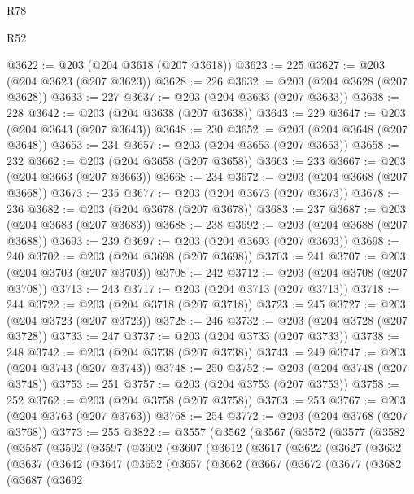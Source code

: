 \begin{lexlean}{R78}
\begin{lexlean}{R52}
\begin{coremodule}
{{{{{{{{{{{{{{{{{{{{{{{{{{{{{{{{{{{{{{{{{{{{{{{{{{{{{{{{{{{{{{{{{{{{{{{{{{{{{{{{{{{{{{{{{{{{{{{{{{{{{{{{{{{{{{{{{{{{{{{{{{{{{{{{{{{{{{{{{{{{{{{{{{{{{{{{{{{{{{{{{{{{{{{{{{{{{{{{{{{{{{{{{{{{{{{{{{{{{{@3622 := @203 (@204 @3618 (@207 @3618))
@3623 := 225
@3627 := @203 (@204 @3623 (@207 @3623))
@3628 := 226
@3632 := @203 (@204 @3628 (@207 @3628))
@3633 := 227
@3637 := @203 (@204 @3633 (@207 @3633))
@3638 := 228
@3642 := @203 (@204 @3638 (@207 @3638))
@3643 := 229
@3647 := @203 (@204 @3643 (@207 @3643))
@3648 := 230
@3652 := @203 (@204 @3648 (@207 @3648))
@3653 := 231
@3657 := @203 (@204 @3653 (@207 @3653))
@3658 := 232
@3662 := @203 (@204 @3658 (@207 @3658))
@3663 := 233
@3667 := @203 (@204 @3663 (@207 @3663))
@3668 := 234
@3672 := @203 (@204 @3668 (@207 @3668))
@3673 := 235
@3677 := @203 (@204 @3673 (@207 @3673))
@3678 := 236
@3682 := @203 (@204 @3678 (@207 @3678))
@3683 := 237
@3687 := @203 (@204 @3683 (@207 @3683))
@3688 := 238
@3692 := @203 (@204 @3688 (@207 @3688))
@3693 := 239
@3697 := @203 (@204 @3693 (@207 @3693))
@3698 := 240
@3702 := @203 (@204 @3698 (@207 @3698))
@3703 := 241
@3707 := @203 (@204 @3703 (@207 @3703))
@3708 := 242
@3712 := @203 (@204 @3708 (@207 @3708))
@3713 := 243
@3717 := @203 (@204 @3713 (@207 @3713))
@3718 := 244
@3722 := @203 (@204 @3718 (@207 @3718))
@3723 := 245
@3727 := @203 (@204 @3723 (@207 @3723))
@3728 := 246
@3732 := @203 (@204 @3728 (@207 @3728))
@3733 := 247
@3737 := @203 (@204 @3733 (@207 @3733))
@3738 := 248
@3742 := @203 (@204 @3738 (@207 @3738))
@3743 := 249
@3747 := @203 (@204 @3743 (@207 @3743))
@3748 := 250
@3752 := @203 (@204 @3748 (@207 @3748))
@3753 := 251
@3757 := @203 (@204 @3753 (@207 @3753))
@3758 := 252
@3762 := @203 (@204 @3758 (@207 @3758))
@3763 := 253
@3767 := @203 (@204 @3763 (@207 @3763))
@3768 := 254
@3772 := @203 (@204 @3768 (@207 @3768))
@3773 := 255
@3822 := @3557
    (@3562
      (@3567
        (@3572
          (@3577
            (@3582
              (@3587
                (@3592
                  (@3597
                    (@3602
                      (@3607
                        (@3612
                          (@3617
                            (@3622
                              (@3627
                                (@3632
                                  (@3637
                                    (@3642
                                      (@3647
                                        (@3652
                                          (@3657
                                            (@3662
                                              (@3667
                                                (@3672
                                                  (@3677
                                                    (@3682
                                                      (@3687
                                                        (@3692
}}}}}}}}}}}}}}}}}}}}}}}}}}}}}}}}}}}}}}}}}}}}}}}}}}}}}}}}}}}}}}}}}}}}}}}}}}}}}}}}}}}}}}}}}}}}}}}}}}}}}}}}}}}}}}}}}}}}}}}}}}}}}}}}}}}}}}}}}}}}}}}}}}}}}}}}}}}}}}}}}}}}}}}}}}}}}}}}}}}}}}}}}}}}}}}}}}}}}}
\end{coremodule}
\end{lexlean}
\end{lexlean}
